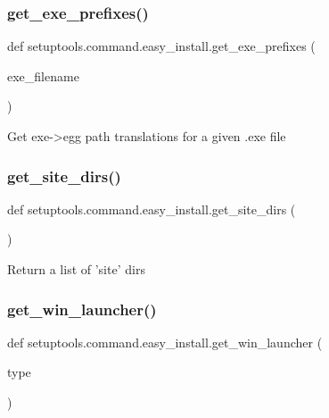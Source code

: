\subsubsection{\texorpdfstring{get\+\_\+exe\+\_\+prefixes()}{get\_exe\_prefixes()}}
{\footnotesize\ttfamily def setuptools.\+command.\+easy\+\_\+install.\+get\+\_\+exe\+\_\+prefixes (\begin{DoxyParamCaption}\item[{}]{exe\+\_\+filename }\end{DoxyParamCaption})}

\begin{DoxyVerb}Get exe->egg path translations for a given .exe file\end{DoxyVerb}
 \mbox{\label{namespacesetuptools_1_1command_1_1easy__install_a2c8e8bb7ad16bf452892898a80bc9958}} 
\subsubsection{\texorpdfstring{get\+\_\+site\+\_\+dirs()}{get\_site\_dirs()}}
{\footnotesize\ttfamily def setuptools.\+command.\+easy\+\_\+install.\+get\+\_\+site\+\_\+dirs (\begin{DoxyParamCaption}{ }\end{DoxyParamCaption})}

\begin{DoxyVerb}Return a list of 'site' dirs
\end{DoxyVerb}
 \mbox{\label{namespacesetuptools_1_1command_1_1easy__install_ac8a1f99006fa5280139c286ec6d3e782}} 
\subsubsection{\texorpdfstring{get\+\_\+win\+\_\+launcher()}{get\_win\_launcher()}}
{\footnotesize\ttfamily def setuptools.\+command.\+easy\+\_\+install.\+get\+\_\+win\+\_\+launcher (\begin{DoxyParamCaption}\item[{}]{type }\end{DoxyParamCaption})}

